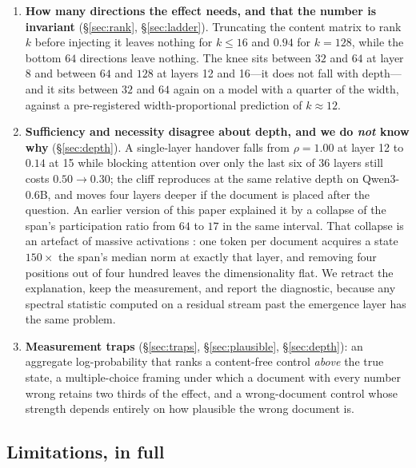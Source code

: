 \documentclass{article}
\begin{document}
\begin{enumerate}
With the document ahead of the question its span is bit-identical across a
skill's instances, which we verify rather than argue; placed after the question
so that it can see the task, another instance's vector recovers $1.06$ against
the instance's own $1.00$, and the instance-specific remainder recovers exactly
nothing.
\item \textbf{How many directions the effect needs, and that the number is
invariant} (\S\ref{sec:rank}, \S\ref{sec:ladder}). Truncating the content
matrix to rank $k$ before injecting it leaves nothing for $k\le16$ and $0.94$
for $k=128$, while the bottom $64$ directions leave nothing. The knee sits
between $32$ and $64$ at layer 8 and between $64$ and $128$ at layers 12 and
16---it does not fall with depth---and it sits between $32$ and $64$ again on a
model with a quarter of the width, against a pre-registered width-proportional
prediction of $k\approx12$.
\item \textbf{Sufficiency and necessity disagree about depth, and we do
\emph{not} know why} (\S\ref{sec:depth}). A single-layer handover falls from
$\rho = 1.00$ at layer 12 to $0.14$ at 15 while blocking attention over only the
last six of 36 layers still costs $0.50 \to 0.30$; the cliff reproduces at the
same relative depth on Qwen3-0.6B, and moves four layers deeper if the document
is placed after the question. An earlier version of this paper explained it by a
collapse of the span's participation ratio from $64$ to $17$ in the same
interval. That collapse is an artefact of massive activations
\citep{sun2024massive}: one token per document acquires a state $150\times$ the
span's median norm at exactly that layer, and removing four positions out of
four hundred leaves the dimensionality flat. We retract the explanation, keep
the measurement, and report the diagnostic, because any spectral statistic
computed on a residual stream past the emergence layer has the same problem.
\item \textbf{Measurement traps} (\S\ref{sec:traps},
\S\ref{sec:plausible}, \S\ref{sec:depth}): an aggregate log-probability that ranks a content-free
control \emph{above} the true state, a multiple-choice framing under which a
document with every number wrong retains two thirds of the effect, and a
wrong-document control whose strength depends entirely on how plausible the
wrong document is.
\end{enumerate}




\subsection{Limitations, in full}
\label{app:limits}
\end{document}
